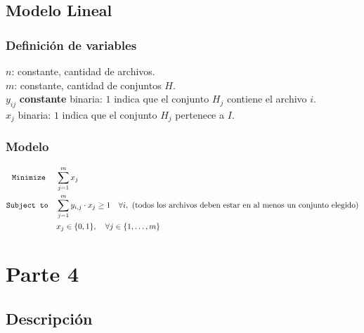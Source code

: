 \documentclass[11pt, a4paper, pdftex]{article}
\begin{document}
\subsection{Modelo Lineal}

\subsubsection{Definición de variables}

\noindent $n$: constante, cantidad de archivos. \\

\noindent $m$: constante, cantidad de conjuntos $H$. \\

\noindent $y_{ij}$ \textbf{constante} binaria: $1$ indica que el conjunto $H_{j}$ contiene el archivo $i$. \\

\noindent $x_{j}$ binaria: $1$ indica que el conjunto $H_{j}$ pertenece a $I$. \\

\subsubsection{Modelo}

\begin{alignat*}{2}
    \texttt{Minimize}\quad\,\, & \sum_{j = 1}^{m} x_{j}\\
    \texttt{Subject to}\quad   & \sum_{j=1}^{m} y_{i,j} \cdot x_j \geq 1 \quad \forall i,\ \text{(todos los archivos deben estar en al menos un conjunto elegido)}\\
              & x_{j} \in \{0,1\}, \quad \forall j \in \{1, \ldots, m\} \\
\end{alignat*}

\newpage
\section{Parte 4}\label{cuarta:parte}

\subsection{Descripción}
\end{document}
